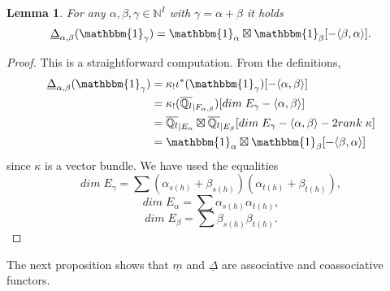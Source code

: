 \documentclass[a4paper,10pt]{amsart}
\def\N{\mathbb{N}}
\def\qlb{\overline{\mathbb{Q}_l}}
\newtheorem{lem}[theo]{Lemma}
\numberwithin{equation}{section}
\begin{document}
\vspace{.1in}

\begin{lem} For any $\alpha, \beta , \gamma \in \N^I$ with $\gamma=\alpha+\beta$ it holds
$$\underline{\Delta}_{\alpha,\beta}(\mathbbm{1}_{\gamma})=\mathbbm{1}_{\alpha} \boxtimes \mathbbm{1}_{\beta}[-\langle \beta, \alpha\rangle].$$
\end{lem}
\begin{proof} This is a straightforward computation. From the definitions, 
\begin{equation*}
\begin{split}
\underline{\Delta}_{\alpha,\beta}(\mathbbm{1}_{\gamma})&= \kappa_{!} \iota^*(\mathbbm{1}_{\gamma})[-\langle \alpha, \beta\rangle]\\ 
&=\kappa_{!}(\qlb_{|F_{\alpha,\beta}})[dim\;E_{\gamma} -\langle \alpha,\beta\rangle]\\
&=\qlb_{|E_{\alpha}}\boxtimes \qlb_{|E_{\beta}}[dim\;E_{\gamma}-\langle \alpha, \beta \rangle -2 rank\;\kappa]\\
&=\mathbbm{1}_{\alpha} \boxtimes \mathbbm{1}_{\beta}[-\langle \beta, \alpha \rangle] 
\end{split}
\end{equation*}
since $\kappa$ is a vector bundle. We have used the equalities
$$dim\;E_{\gamma}=\sum (\alpha_{s(h)}+\beta_{s(h)})(\alpha_{t(h)}+\beta_{t(h)}),$$
$$dim\;E_{\alpha}=\sum \alpha_{s(h)}\alpha_{t(h)},$$
$$dim\;E_{\beta}=\sum \beta_{s(h)}\beta_{t(h)}.$$
\end{proof}

\vspace{.1in}

The next proposition shows that $\underline{m}$ and $\underline{\Delta}$ are associative and coassociative functors.

\vspace{.1in}
\end{document}

